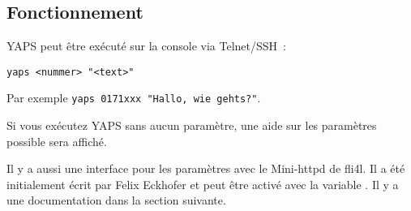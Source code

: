 \begin{description}
\end{description}

\subsection {Fonctionnement}

YAPS peut être exécuté sur la console via Telnet/SSH~:
\begin{small}
\begin{example}
\begin{verbatim}
yaps <nummer> "<text>"
\end{verbatim}
\end{example}
\end{small}

Par exemple \verb|yaps 0171xxx "Hallo, wie gehts?"|.

Si vous exécutez YAPS sans aucun paramètre, une aide sur les paramètres possible
sera affiché.

Il y a aussi une interface pour les paramètres avec le Mini-httpd de fli4l. Il a
été initialement écrit par Felix Eckhofer et peut être activé avec la variable
. Il y a une documentation dans la section suivante.

